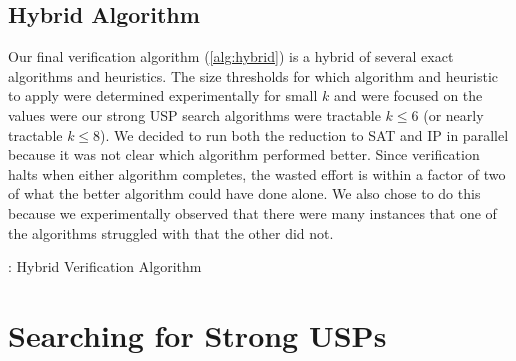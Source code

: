 \documentclass[11pt]{article}
\begin{document}


\subsection{Hybrid Algorithm}

Our final verification algorithm (\autoref{alg:hybrid}) is a hybrid of
several exact algorithms and heuristics.  The size thresholds
for which algorithm and heuristic to apply were determined
experimentally for small $k$ and were focused on the values were our
strong USP search algorithms were tractable $k \le 6$ (or nearly
tractable $k \le 8$).  We decided to run both the reduction to SAT and
IP in parallel because it was not clear which algorithm performed
better.  Since verification halts when either algorithm completes, the
wasted effort is within a factor of two of what the better algorithm
could have done alone.  We also chose to do this because we
experimentally observed that there were many instances that one of the
algorithms struggled with that the other did not.

\begin{algorithm}[t]
  \caption{: Hybrid Verification Algorithm}
  \label{alg:hybrid}
\begin{algorithmic}[1]
    \EndIf
    \EndIf
    \EndIf
  \EndFunction
\end{algorithmic}
\end{algorithm}

\section{Searching for Strong USPs}
\label{sec:search}
\end{document}
